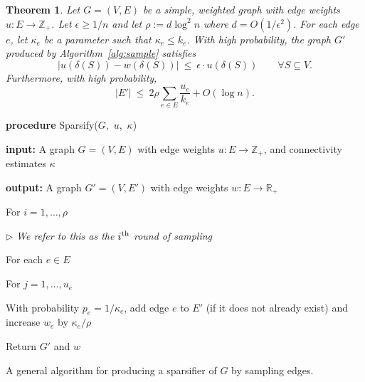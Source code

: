 \documentclass[11pt]{article}
\numberwithin{equation}{section}
\newenvironment{alg}{
    \begin{list}{}{
        \setlength{\itemsep}{2pt}
        \setlength{\parsep}{0pt}
        \setlength{\parskip}{0pt}
        \setlength{\topsep}{1pt}
    }
}
{
    \end{list}
}
\newtheorem{theorem}{Theorem}[section]
\renewcommand{\th}{\ifmmode{^{\textrm{th}}}\else{\textsuperscript{th}\ }\fi}
\newcommand{\bR}{\mathbb{R}}
\newcommand{\bZ}{\mathbb{Z}}
\newcommand{\eps}{\epsilon}
\newcommand{\abs}[1]{\lvert #1 \rvert}
\newcommand{\Abs}[1]{\left\lvert #1 \right\rvert}
\newcommand{\card}[1]{\abs{#1}}
\newcommand{\AlgorithmName}[1]{\label{alg:#1}}
\newcommand{\Algorithm}[1]{Algorithm~\ref{alg:#1}}
\newcommand{\EquationName}[1]{\label{eq:#1}}
\newcommand{\TheoremName}[1]{\label{thm:#1}}
\begin{document}
\begin{theorem}
\TheoremName{mainthm}
Let $G=(V,E)$ be a simple, weighted graph with edge weights $u : E \rightarrow \bZ_+$.
Let $\eps \geq 1/n$ and let $\rho := d \log^2 n$ where $d = O(1/\eps^2)$.
For each edge $e$, let $\kappa_e$ be a parameter such that $\kappa_e \leq k_e$.
With high probability,
the graph $G'$ produced by \Algorithm{sample} satisfies
\begin{equation}
    \EquationName{cutspreserved}
    \Abs{u(\delta(S))-w(\delta(S))} ~\le~ \epsilon \cdot u(\delta(S))
        \qquad\forall S\subseteq V.
\end{equation}
Furthermore, with high probability,
\begin{equation}
    \EquationName{sizebound}
    \card{E'} ~\leq~ 2 \rho \sum_{e \in E} \frac{u_e}{k_e} + O(\log n).
\end{equation}
\end{theorem}

\begin{algorithm}
\begin{alg}
\item	\textbf{procedure} Sparsify($G$,\, $u$,\, $\kappa$)
\item	\textbf{input:} A graph $G=(V,E)$
        with edge weights $u : E \rightarrow \bZ_+$,
        and connectivity estimates $\kappa$
\item	\textbf{output:} A graph $G' = (V,E')$ with edge weights $w : E \rightarrow \bR_+$
\item   For $i=1,\ldots,\rho$
    \begin{alg}
    \item   $\rhd$ \textit{We refer to this as the $i\th$ round of sampling}
    \item   For each $e \in E$
        \begin{alg}
        \item   For $j = 1, \ldots, u_e$
            \begin{alg}
            \item   With probability $p_e = 1/\kappa_e$, add edge $e$ to $E'$
                    (if it does not already exist) and increase $w_e$ by $\kappa_e / \rho$
            \end{alg}
        \end{alg}
    \end{alg}
\item   Return $G'$ and $w$
\end{alg}
\caption{A general algorithm for producing a sparsifier of $G$ by sampling edges.}
\AlgorithmName{sample}
\end{algorithm}
\end{document}
